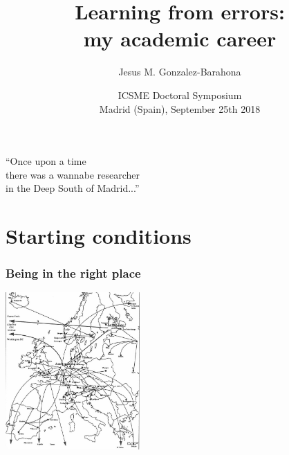 \documentclass[17pt,aspectratio=169,hyperref=pdfusetitle]{beamer}
\title[Learning from errors]{Learning from errors: \\ my academic career}
\author[Jesus M. Gonzalez-Barahona]{Jesus M. Gonzalez-Barahona}
\institute[URJC]{Universidad Rey Juan Carlos \\
  @jgbarah ~~~~~ \url{http://github.com/jgbarah/presentations}}
\date[ICSME Doctoral Symposium]{ICSME Doctoral Symposium \\ Madrid (Spain), September 25th 2018}
\begin{document}
\begin{frame}
  \maketitle
\end{frame}


\begin{frame}

  {\em
    \begin{center}
      ``Once upon a time \\
      there was a wannabe researcher \\
      in the Deep South of Madrid...''\\
    \end{center}
  }
\end{frame}





\section{Starting conditions}


\begin{frame}[fragile]
  \frametitle{Being in the right place}

  \begin{center}
  \includegraphics[height=6cm]{figs/eunet}
  \end{center}  
  
\end{frame}
\end{document}

